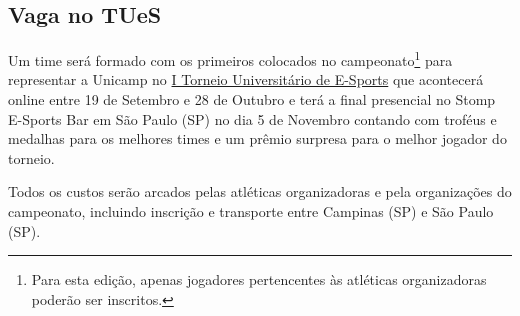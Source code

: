 \subsection{Vaga no TUeS}

Um time será formado com os primeiros colocados no campeonato\footnote{Para esta edição, apenas jogadores pertencentes às atléticas organizadoras poderão ser inscritos.} para representar a Unicamp no \href{https://fb.com/TUeSport/}{I Torneio Universitário de E-Sports} que acontecerá online entre 19 de Setembro e 28 de Outubro e terá a final presencial no Stomp E-Sports Bar em São Paulo (SP) no dia 5 de Novembro contando com troféus e medalhas para os melhores times e um prêmio surpresa para o melhor jogador do torneio.

Todos os custos serão arcados pelas atléticas organizadoras e pela organizações do campeonato, incluindo inscrição e transporte entre Campinas (SP) e São Paulo (SP).
